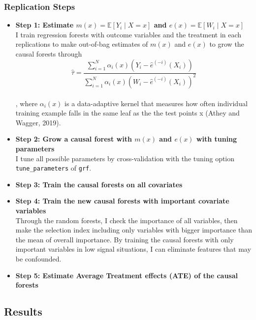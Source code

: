 \documentclass[11pt,a4paper]{article}
\begin{document}
\hypertarget{Replication-Steps}{%
\subsubsection{Replication Steps}\label{Replication-Steps}}
\begin{itemize}
\item \textbf{Step 1: Estimate $m(x) = \mathbb{E}[Y_i\mid X=x]$ and $e(x) = \mathbb{E}[W_i\mid X=x]$} \\
I train regression forests with outcome variables and the treatment in each replications to make out-of-bag estimates of $m(x)$ and $e(x)$ to grow the causal forests through \\
$$\hat{\tau} = \frac{\sum_{i=1}^N \alpha_{i}(x)(Y_{i} - \hat{e}^{(-i)}(X_{i}))}{\sum_{i=1}^N \alpha_{i}(x)(W_{i}- \hat{e}^{(-i)}(X_{i}))^2 }$$\\
, where $\alpha_{i}(x)$ is a data-adaptive kernel that measures how often individual training example falls in the same leaf as the the test points x (Athey and Wagger, 2019).
\\

\item \textbf{Step 2: Grow a causal forest with $m(x)$ and $e(x)$ with tuning parameters} \\
I tune all possible parameters by cross-validation with the tuning 
option \texttt{tune\_parameters} of \texttt{grf}. \\
\item \textbf{Step 3: Train the causal forests on all covariates} \\
\item \textbf{Step 4: Train the new causal forests with important covariate variables}  \\
Through the random forests, I check the importance of all variables, then make the selection index including only variables with bigger importance than the mean of overall importance. By training the causal forests with only important variables in low signal situations, I can eliminate features that may be confounded. \\
\item \textbf{Step 5: Estimate Average Treatment effects (ATE) of the causal forests}
\end{itemize}


\hypertarget{results}{%
\subsection{Results}\label{results}}
\end{document}
